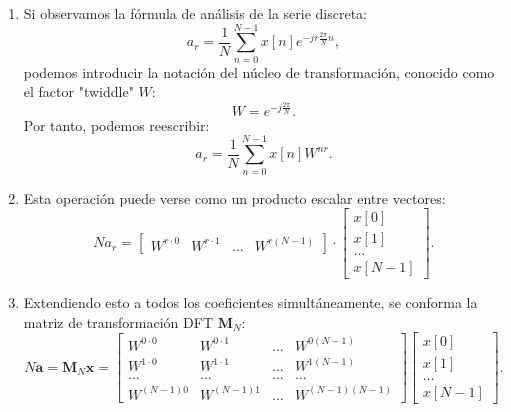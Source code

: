 \begin{enumerate}
	\item Si observamos la fórmula de análisis de la serie discreta:
	\begin{equation}
		a_{r} =  \frac{1}{N} \sum_{n=0}^{N-1} x[n] e^{-jr\frac{2\pi}{N}n},
	\end{equation}
	podemos introducir la notación del núcleo de transformación, conocido como el factor "twiddle" $W$:
	\begin{equation}
		W = e^{-j\frac{2\pi}{N}}.
	\end{equation}
	Por tanto, podemos reescribir:
	\begin{equation}
		a_{r} =  \frac{1}{N} \sum_{n=0}^{N-1} x[n] W^{nr}.
	\end{equation}
	
	\item Esta operación puede verse como un producto escalar entre vectores:
	\begin{equation}
		N a_{r} =
		\begin{bmatrix}
			W^{r \cdot 0} & W^{r \cdot 1} & \dots & W^{r(N-1)}
		\end{bmatrix}
		\cdot 
		\begin{bmatrix}
			x[0] \\ x[1] \\ \dots \\ x[N-1]
		\end{bmatrix}.
	\end{equation}
	
	\item Extendiendo esto a todos los coeficientes simultáneamente, se conforma la matriz de transformación DFT $\mathbf{M}_N$:
	\begin{equation}
		N \mathbf{a} = \mathbf{M}_N \mathbf{x} = 
		\begin{bmatrix}
			W^{0 \cdot 0} & W^{0 \cdot 1} & \dots & W^{0(N-1)} \\
			W^{1 \cdot 0} & W^{1 \cdot 1} & \dots & W^{1(N-1)} \\
			\dots & \dots & \dots & \dots \\
			W^{(N-1)0} & W^{(N-1)1} & \dots & W^{(N-1)(N-1)}
		\end{bmatrix}
		\begin{bmatrix}
			x[0] \\ x[1] \\ \dots \\ x[N-1]
		\end{bmatrix}.
	\end{equation}
	

\end{enumerate}
